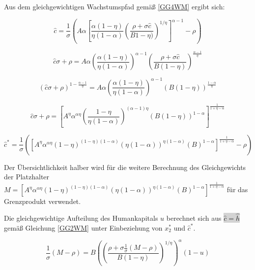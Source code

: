 Aus dem gleichgewichtigen Wachstumspfad gemä{\ss} \eqref{GG4WM} ergibt sich: 


	\begin{equation}
		\hat{c}=\frac{1}{\sigma}\left(A\alpha \left[\frac{\alpha(1-\eta)}{\eta(1-\alpha)}\left(\frac{\rho+\sigma\hat{c}}{B1-\eta)}\right)^{1/\eta}\right]^{\alpha-1}-\rho\right)
	\end{equation}


	\begin{equation*}
		\hat{c}\sigma+\rho=A\alpha\left(\frac{\alpha(1-\eta)}{\eta(1-\alpha)}\right)^{\alpha-1}\left(\frac{\rho+\sigma\hat{c}}{B(1-\eta)}\right)^{\frac{\alpha-1}{\eta}}
	\end{equation*}


	\begin{equation*}
		(\hat{c}\sigma+\rho)^{1-\frac{\alpha-1}{\eta}}=A\alpha\left(\frac{\alpha(1-\eta)}{\eta(1-\alpha)}\right)^{\alpha-1}\left(B(1-\eta)\right)^{\frac{1-\alpha}{\eta}}
	\end{equation*}


	\begin{equation*}
		\hat{c}\sigma+\rho=\left[A^\eta\alpha^{\alpha\eta}\left(\frac{1-\eta}{\eta(1-\alpha)}\right)^{(\alpha-1)\eta}\left(B(1-\eta)\right)^{1-\alpha}\right]^\frac{1}{1+\eta-\alpha}
	\end{equation*}


	\begin{equation}
		\boxed{\hat{c}^*=\frac{1}{\sigma}\left(\left[A^\eta\alpha^{\alpha\eta}(1-\eta)^{(1-\eta)(1-\alpha)}(\eta(1-\alpha))^{\eta(1-\alpha)}(B)^{1-\alpha}\right]^\frac{1}{1+\eta-\alpha}-\rho\right)}
	\end{equation}


Der Übersichtlichkeit halber wird für die weitere Berechnung des Gleichgewichts der Platzhalter $M=\left[A^\eta\alpha^{\alpha\eta}(1-\eta)^{(1-\eta)(1-\alpha)}(\eta(1-\alpha))^{\eta(1-\alpha)}(B)^{1-\alpha}\right]^\frac{1}{1+\eta-\alpha}$ für das Grenzprodukt verwendet.


Die gleichgewichtige Aufteilung des Humankapitals $u$ berechnet sich aus \colorbox{lightgray}{$\hat{c}=\hat{h}$} gemä{\ss} Gleichung \eqref{GG2WM} unter Einbeziehung von $x_2^*$ und $\hat{c}^*$. 


	\begin{equation}
		\frac{1}{\sigma} (M-\rho)=B\left(\left(\frac{\rho+\sigma\frac{1}{\sigma}(M-\rho)}{B(1-\eta)}\right)^{1/\eta}\right)^\alpha(1-u)
	\end{equation}

